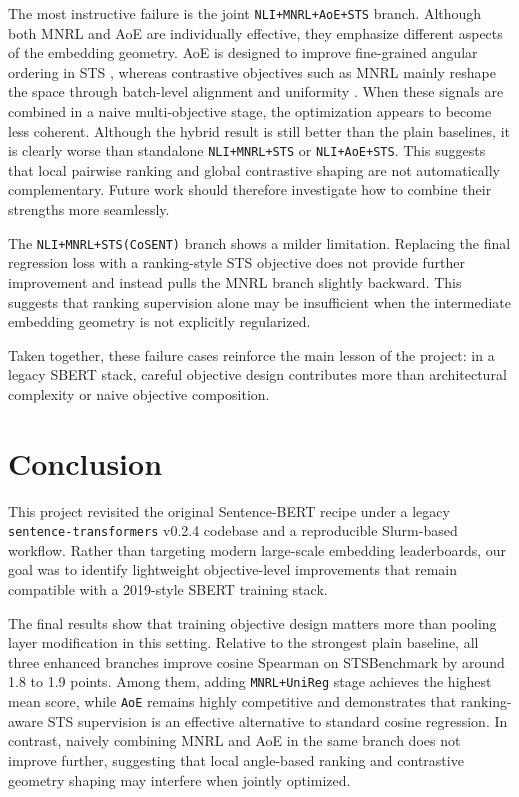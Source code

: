 \documentclass[letterpaper]{article} %
\begin{document}
The most instructive failure is the joint \texttt{NLI+MNRL+AoE+STS} branch. Although both MNRL and AoE are individually effective, they emphasize different aspects of the embedding geometry. AoE is designed to improve fine-grained angular ordering in STS \cite{li-li-2024-aoe}, whereas contrastive objectives such as MNRL mainly reshape the space through batch-level alignment and uniformity \cite{gao-etal-2021-simcse}. When these signals are combined in a naive multi-objective stage, the optimization appears to become less coherent. Although the hybrid result is still better than the plain baselines, it is clearly worse than standalone \texttt{NLI+MNRL+STS} or \texttt{NLI+AoE+STS}. This suggests that local pairwise ranking and global contrastive shaping are not automatically complementary. Future work should therefore investigate how to combine their strengths more seamlessly.

The \texttt{NLI+MNRL+STS(CoSENT)} branch shows a milder limitation. Replacing the final regression loss with a ranking-style STS objective does not provide further improvement and instead pulls the MNRL branch slightly backward. This suggests that ranking supervision alone may be insufficient when the intermediate embedding geometry is not explicitly regularized.

Taken together, these failure cases reinforce the main lesson of the project: in a legacy SBERT stack, careful objective design contributes more than architectural complexity or naive objective composition.

\section{Conclusion}

This project revisited the original Sentence-BERT recipe under a legacy
\texttt{sentence-transformers} v0.2.4 codebase and a reproducible Slurm-based workflow. Rather than
targeting modern large-scale embedding leaderboards, our goal was to identify lightweight
objective-level improvements that remain compatible with a 2019-style SBERT training stack.

The final results show that training objective design matters more than pooling layer modification in this setting. 
Relative to the strongest plain baseline, all three enhanced branches improve cosine Spearman on STSBenchmark by around 1.8 to 1.9 points. 
Among them,
adding \texttt{MNRL+UniReg} stage achieves the highest mean score, 
while \texttt{AoE} remains highly competitive and demonstrates that ranking-aware STS supervision is an effective alternative to standard cosine regression. 
In contrast, naively combining MNRL and AoE in the same branch does not
improve further, suggesting that local angle-based ranking and contrastive geometry shaping may
interfere when jointly optimized.
\end{document}

